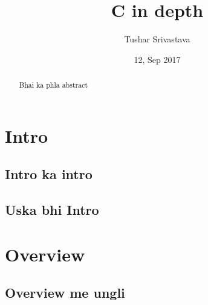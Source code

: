 \documentclass[12pt]{article}
\title{C in depth}
\author{Tushar Srivastava}
\date{12, Sep 2017}
\begin{document}
\maketitle
\begin{abstract}
Bhai ka phla abstract 
\end{abstract}
\section{Intro}
\subsection{Intro ka intro}
\subsection{Uska bhi Intro}
\section{Overview}
\subsection{Overview me ungli}
\end{document}
